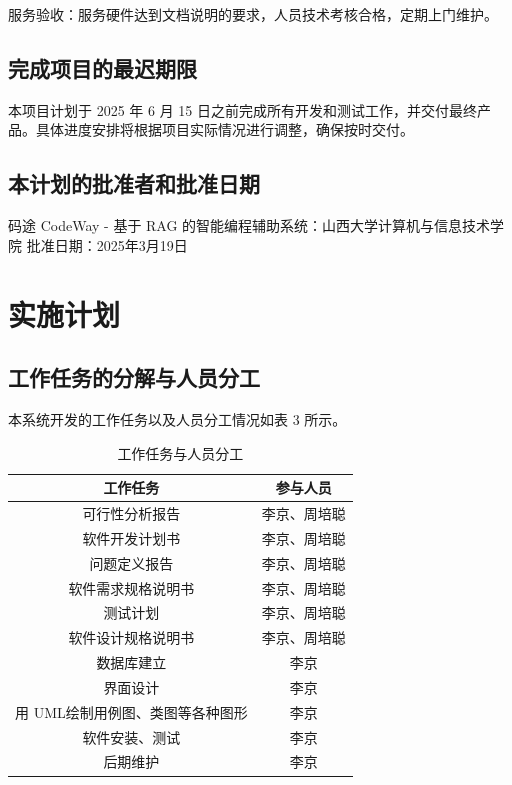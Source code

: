 \documentclass[
    report,     %
    oneside,    %
    UTF8,       %
    zihao=-4    %
]{config} %
\begin{document}
服务验收：服务硬件达到文档说明的要求，人员技术考核合格，定期上门维护。

\subsection{完成项目的最迟期限}
本项目计划于 2025 年 6 月 15 日之前完成所有开发和测试工作，并交付最终产品。具体进度安排将根据项目实际情况进行调整，确保按时交付。
\subsection{本计划的批准者和批准日期}
码途 CodeWay - 基于 RAG 的智能编程辅助系统：山西大学计算机与信息技术学院
批准日期：2025年3月19日
\section{实施计划}
\subsection{工作任务的分解与人员分工}
本系统开发的工作任务以及人员分工情况如表 3 所示。
\begin{table}[H] %
    \centering %
    \caption{工作任务与人员分工} %
    \label{tab:task-participants} %
    \renewcommand\arraystretch{0.85} %
    \setlength{\tabcolsep}{12pt} %
    \begin{tabular}{cc} %
        \toprule[1.5pt] %
        \textbf{工作任务} & \textbf{参与人员} \\ %
        \midrule[0.8pt] %
        可行性分析报告 & 李京、周培聪\\ 
        软件开发计划书 & 李京、周培聪\\ 
        问题定义报告 & 李京、周培聪\\ 
        软件需求规格说明书 & 李京、周培聪\\ 
        测试计划 & 李京、周培聪\\ 
        软件设计规格说明书  & 李京、周培聪\\ 
        数据库建立  & 李京\\ 
        界面设计  & 李京\\ 
        用 UML绘制用例图、类图等各种图形  & 李京\\ 
        软件安装、测试 & 李京\\ 
        后期维护  & 李京\\ 
        \hline\hline %
    \end{tabular}
\end{table}
\end{document}
